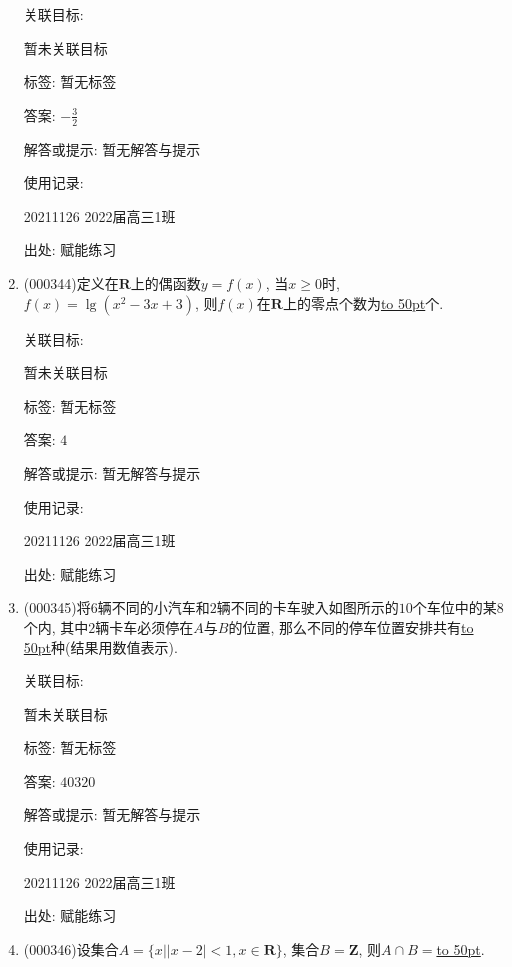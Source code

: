 \documentclass[10pt,a4paper]{article}
\newcommand{\blank}[1]{\underline{\hbox to #1pt{}}}
\begin{document}
\begin{enumerate}[1.]
关联目标:

暂未关联目标



标签: 暂无标签

答案: $-\frac 32$

解答或提示: 暂无解答与提示

使用记录:

20211126	2022届高三1班	


出处: 赋能练习
\item { (000344)}定义在$\mathbf{R}$上的偶函数$y=f(x)$, 当$x\ge 0$时, $f(x)=\lg (x^2-3x+3)$, 则$f(x)$在$\mathbf{R}$上的零点个数为\blank{50}个.


关联目标:

暂未关联目标



标签: 暂无标签

答案: $4$

解答或提示: 暂无解答与提示

使用记录:

20211126	2022届高三1班	


出处: 赋能练习
\item { (000345)}将$6$辆不同的小汽车和$2$辆不同的卡车驶入如图所示的$10$个车位中的某$8$个内, 其中$2$辆卡车必须停在$A$与$B$的位置, 那么不同的停车位置安排共有\blank{50}种(结果用数值表示).
\begin{center}
\end{center}


关联目标:

暂未关联目标



标签: 暂无标签

答案: $40320$

解答或提示: 暂无解答与提示

使用记录:

20211126	2022届高三1班	


出处: 赋能练习
\item { (000346)}设集合$A=\{x||x-2|<1,x\in \mathbf{R}\}$, 集合$B=\mathbf{Z}$, 则$A\cap B=$\blank{50}.



\end{enumerate}
\end{document}
